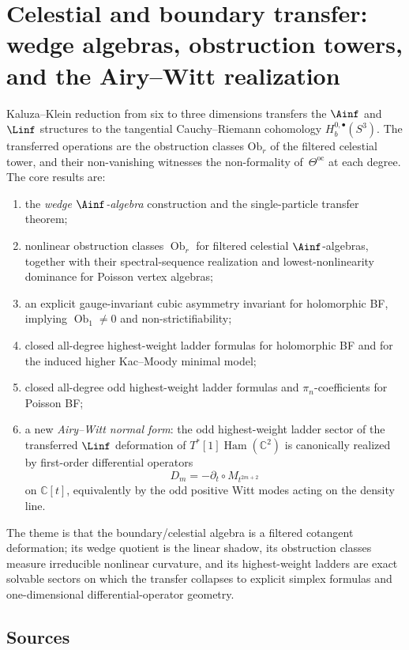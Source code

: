 \chapter{Celestial and boundary transfer: wedge algebras, obstruction towers, and the Airy--Witt realization}
\label{ch:celestial-boundary-transfer}

Kaluza--Klein reduction from six to three dimensions transfers the
$\Ainf$ and $\Linf$ structures to the tangential Cauchy--Riemann
cohomology $H_b^{0,\bullet}(S^3)$. The transferred operations are
the obstruction classes $\mathrm{Ob}_r$ of the filtered celestial
tower, and their non-vanishing witnesses the non-formality
of~$\Theta^{\mathrm{oc}}$ at each degree. The core results are:
\begin{enumerate}[label=\textup{(\arabic*)},leftmargin=2.2em]
\item the \emph{wedge $\Ainf$-algebra} construction and the
 single-particle transfer theorem;
\item nonlinear obstruction classes $\operatorname{Ob}_r$ for filtered celestial
 $\Ainf$-algebras, together with their spectral-sequence realization
 and lowest-nonlinearity dominance for Poisson vertex algebras;
\item an explicit gauge-invariant cubic asymmetry invariant for
 holomorphic BF, implying $\operatorname{Ob}_1\neq 0$ and
 non-strictifiability;
\item closed all-degree highest-weight ladder formulas for holomorphic
 BF and for the induced higher Kac--Moody minimal model;
\item closed all-degree odd highest-weight ladder formulas and
 $\pi_n$-coefficients for Poisson BF;
\item a new \emph{Airy--Witt normal form}: the odd highest-weight
 ladder sector of the transferred $\Linf$ deformation of
 $T^*[1]\operatorname{Ham}(\mathbb{C}^2)$ is canonically realized by first-order
 differential operators
 \[
 D_m=-\partial_t\circ M_{t^{2m+2}}
 \]
 on $\mathbb{C}[t]$, equivalently by the odd positive Witt modes
 acting on the density line.
\end{enumerate}
The theme is that the boundary/celestial algebra is a filtered
cotangent deformation; its wedge quotient is the linear shadow, its
obstruction classes measure irreducible nonlinear curvature, and its
highest-weight ladders are exact solvable sectors on which the
transfer collapses to explicit simplex formulas and one-dimensional
differential-operator geometry.


\section{Sources}
\label{sec:cbt-orientation}

